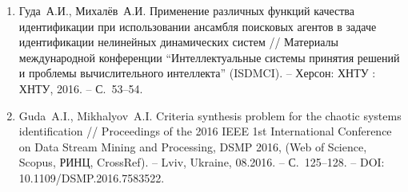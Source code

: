 \begin{enumerate}
\item
Гуда~А.И., Михалёв~А.И. Применение различных функций качества идентификации
при использовании ансамбля поисковых агентов в задаче идентификации нелинейных динамических систем
// Материалы международной конференции ``Интеллектуальные системы принятия решений и проблемы вычислительного интеллекта''
(ISDMCI). -- Херсон: ХНТУ : ХНТУ, 2016. -- С.~53--54.

\item
Guda~A.I., Mikhalyov~A.I. Criteria synthesis problem for the chaotic systems identification //
Proceedings of the 2016 IEEE 1st International Conference on Data Stream Mining and
Processing, DSMP 2016, (Web of Science, Scopus, РИНЦ, CrossRef). -- Lviv, Ukraine,
08.2016. -- С.~125--128. -- DOI: 10.1109/DSMP.2016.7583522.

\end{enumerate}

